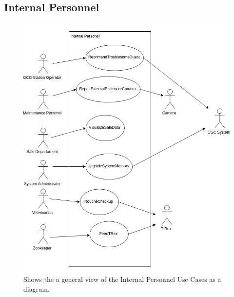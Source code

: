 \documentclass[12pt]{article}
\begin{document}
\subsection{Internal Personnel}
\begin{figure}[H]
    \centerline{\includegraphics[scale=.30]{Use_Cases__Internal.png}}
    \caption{Shows the a general view of the Internal Personnel Use Cases as a diagram.}
    \label{fig:usecaseguest}
\end{figure}    
\end{document}
